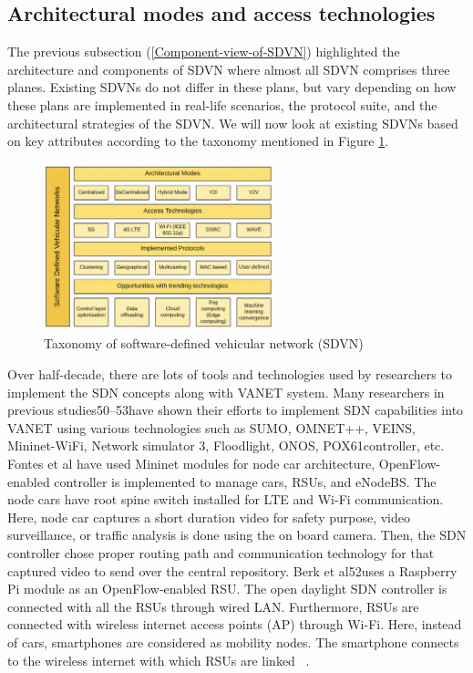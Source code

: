 \documentclass[
  oneside,
  11pt, a4paper,
  footinclude=true,
  headinclude=true,
  cleardoublepage=empty
]{scrbook}
\begin{document}
\subsection{Architectural modes and access technologies}
\label{Architectural-modes-and-access-technologies}


The previous subsection (\ref{Component-view-of-SDVN}) highlighted the architecture and components of SDVN where almost all SDVN comprises three planes. Existing SDVNs do not differ in these plans, but vary depending on how these plans are implemented in real-life scenarios, the protocol suite, and the architectural strategies of the SDVN. We will now look at existing SDVNs based on key attributes according to the taxonomy mentioned in Figure \ref{sdvnVv}.\par

\begin{figure}[H]
\begin{center}
  \includegraphics[width=0.6\textwidth]{img/taxonomias sdvn.png}
\end{center}
  \caption{Taxonomy of software-defined vehicular network (SDVN) ~\cite{Bhatia2019sdvn}}
  \centering  
\label{sdvnVv}
\end{figure}

 Over half-decade, there are lots of tools and technologies used by researchers to implement the SDN concepts along with VANET system. Many researchers in previous studies50–53have shown their efforts to implement SDN capabilities into VANET using various technologies such as SUMO, OMNET++, VEINS, Mininet-WiFi, Network simulator 3, Floodlight, ONOS, POX61controller, etc. Fontes et al have used Mininet modules for node car architecture, OpenFlow-enabled controller is implemented to manage cars, RSUs, and eNodeBS. The node cars have root spine switch installed for LTE and Wi-Fi communication. Here, node car captures a short duration video for safety purpose, video surveillance, or traffic analysis is done using the on board camera. Then, the SDN controller chose proper routing path and communication technology for that captured video to send over the central repository. Berk et al52uses a Raspberry Pi module as an OpenFlow-enabled RSU. The open daylight SDN controller is connected with all the RSUs through wired LAN. Furthermore, RSUs are connected with wireless internet access points (AP) through Wi-Fi. Here, instead of cars, smartphones are considered as mobility nodes. The smartphone connects to the wireless internet with which RSUs are linked ~\cite{Bhatia2019sdvn}.\par
 
\end{document}
